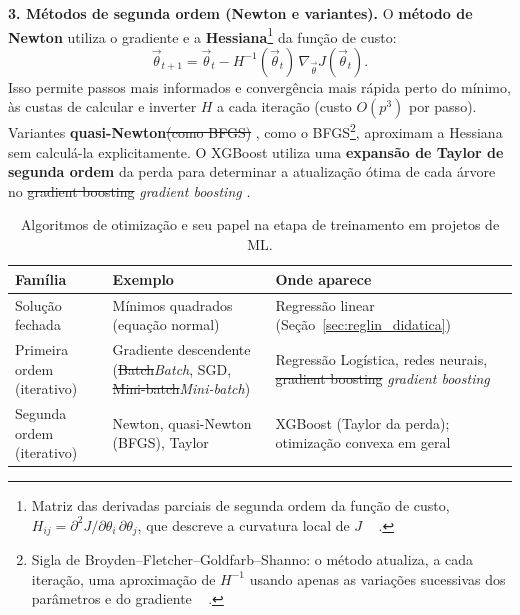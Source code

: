 \documentclass[msc]{on} %
\makeatletter
\providecommand{\DIFaddtex}[1]{{\protect\color{red}#1}} %
\providecommand{\DIFdeltex}[1]{{\protect\color{red}\sout{#1}}} %
\providecommand{\DIFaddbegin}{} %
\providecommand{\DIFaddend}{} %
\providecommand{\DIFdelbegin}{} %
\providecommand{\DIFdelend}{} %
\providecommand{\DIFaddFL}[1]{\DIFadd{#1}} %
\providecommand{\DIFdelFL}[1]{\DIFdel{#1}} %
\providecommand{\DIFaddbeginFL}{} %
\providecommand{\DIFaddendFL}{} %
\providecommand{\DIFdelbeginFL}{} %
\providecommand{\DIFdelendFL}{} %
\providecommand{\DIFadd}[1]{\texorpdfstring{\DIFaddtex{#1}}{#1}} %
\providecommand{\DIFdel}[1]{\texorpdfstring{\DIFdeltex{#1}}{}} %
\let\sout@orig\sout %
\renewcommand{\sout}[1]{\ifmmode\text{\sout@orig{\ensuremath{#1}}}\else\sout@orig{#1}\fi} %
\makeatother
\begin{document}
\textbf{3. Métodos de segunda ordem (Newton e variantes).} O \textbf{método de Newton} utiliza o gradiente e a \textbf{Hessiana}\DIFaddbegin \footnote{\DIFadd{Matriz das derivadas parciais de segunda ordem da função de custo, $H_{ij} = \partial^2 J / \partial\theta_i\,\partial\theta_j$, que descreve a curvatura local de $J$ \mbox{%
\citep{Nocedal2006}}\hskip0pt%
.}} \DIFaddend da função de custo:
\[
\vec{\theta}_{t+1} = \vec{\theta}_t - H^{-1}(\vec{\theta}_t) \, \nabla_{\vec{\theta}} J(\vec{\theta}_t).
\]
Isso permite passos mais informados e convergência mais rápida perto do mínimo, às custas de calcular e inverter \(H\) a cada iteração (custo \(O(p^3)\) por passo). Variantes \textbf{quasi-Newton}\DIFdelbegin \DIFdel{(como BFGS) }\DIFdelend \DIFaddbegin \DIFadd{, como o BFGS}\footnote{\DIFadd{Sigla de Broyden--Fletcher--Goldfarb--Shanno: o método atualiza, a cada iteração, uma aproximação de $H^{-1}$ usando apenas as variações sucessivas dos parâmetros e do gradiente \mbox{%
\citep[cap.~6]{Nocedal2006}}\hskip0pt%
.}}\DIFadd{, }\DIFaddend aproximam a Hessiana sem calculá-la explicitamente. O XGBoost utiliza uma \textbf{expansão de Taylor de segunda ordem} da perda para determinar a atualização ótima de cada árvore no \DIFdelbegin \DIFdel{gradient boosting }\DIFdelend \DIFaddbegin \textit{\DIFadd{gradient boosting}} \DIFaddend \citep{geron2019maos}.

\begin{table}[htbp]
\centering
\small
\caption{Algoritmos de otimização e seu papel na etapa de treinamento em projetos de ML.}
\label{tab:otimizacao}
\DIFdelbeginFL %
\DIFdelendFL \DIFaddbeginFL \begin{tabular}{@{}p{3.0cm}p{4.8cm}p{6.2cm}@{}}
\DIFaddendFL \hline
\textbf{Família} & \textbf{Exemplo} & \textbf{Onde aparece} \\
\hline
Solução fechada & Mínimos quadrados (equação normal) & Regressão linear (Seção~\ref{sec:reglin_didatica}) \\
\hline
Primeira ordem (iterativo) & Gradiente descendente (\DIFdelbeginFL \DIFdelFL{Batch}\DIFdelendFL \DIFaddbeginFL \textit{\DIFaddFL{Batch}}\DIFaddendFL , SGD, \DIFdelbeginFL \DIFdelFL{Mini-batch}\DIFdelendFL \DIFaddbeginFL \textit{\DIFaddFL{Mini-batch}}\DIFaddendFL ) & Regressão Logística, redes neurais, \DIFdelbeginFL \DIFdelFL{gradient boosting }\DIFdelendFL \DIFaddbeginFL \textit{\DIFaddFL{gradient boosting}} \DIFaddendFL \\
\hline
Segunda ordem (iterativo) & Newton, quasi-Newton (BFGS), Taylor & XGBoost (Taylor da perda); otimização convexa em geral \\
\hline
\end{tabular}
\end{table}
\end{document}
